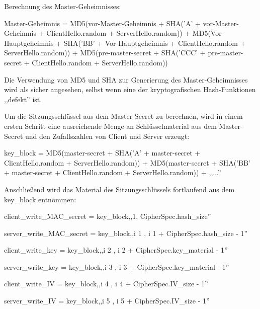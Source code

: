 \documentclass[a4paper]{article}
\begin{document}
\begin{multicols}{3}
\begin{itemize*}
\begin{itemize*}
                  \item Berechnung des Master-Geheimnisses:
                  \begin{itemize*}
                        \item Master-Geheimnis = MD5(vor-Master-Geheimnis + SHA('A' + vor-Master-Geheimnis + ClientHello.random + ServerHello.random)) + MD5(Vor-Hauptgeheimnis + SHA('BB' + Vor-Hauptgeheimnis + ClientHello.random + ServerHello.random)) + MD5(pre-master-secret + SHA('CCC' + pre-master-secret + ClientHello.random + ServerHello.random))
                  \end{itemize*}
                  \item Die Verwendung von MD5 und SHA zur Generierung des Master-Geheimnisses
                  wird als sicher angesehen, selbst wenn eine der kryptografischen
                  Hash-Funktionen ,,defekt'' ist.
                  \item Um die Sitzungsschlüssel aus dem Master-Secret zu berechnen, wird in
                  einem ersten Schritt eine ausreichende Menge an Schlüsselmaterial aus
                  dem Master-Secret und den Zufallszahlen von Client und Server erzeugt:
                  \begin{itemize*}
                        \item key\_block = MD5(master-secret + SHA('A' + master-secret + ClientHello.random + ServerHello.random)) + MD5(master-secret + SHA('BB' + master-secret + ClientHello.random + ServerHello.random)) + ,,...''
                  \end{itemize*}
                  \item Anschließend wird das Material des Sitzungsschlüssels fortlaufend aus dem key\_block entnommen:
                  \begin{itemize*}
                        \item client\_write\_MAC\_secret = key\_block,,1, CipherSpec.hash\_size''
                        \item server\_write\_MAC\_secret = key\_block,,i 1 , i 1 + CipherSpec.hash\_size - 1''
                        \item client\_write\_key = key\_block,,i 2 , i 2 + CipherSpec.key\_material - 1''
                        \item server\_write\_key = key\_block,,i 3 , i 3 + CipherSpec.key\_material - 1''
                        \item client\_write\_IV = key\_block,,i 4 , i 4 + CipherSpec.IV\_size - 1''
                        \item server\_write\_IV = key\_block,,i 5 , i 5 + CipherSpec.IV\_size - 1''

\end{itemize*}
\end{itemize*}
\end{itemize*}
\end{multicols}
\end{document}
